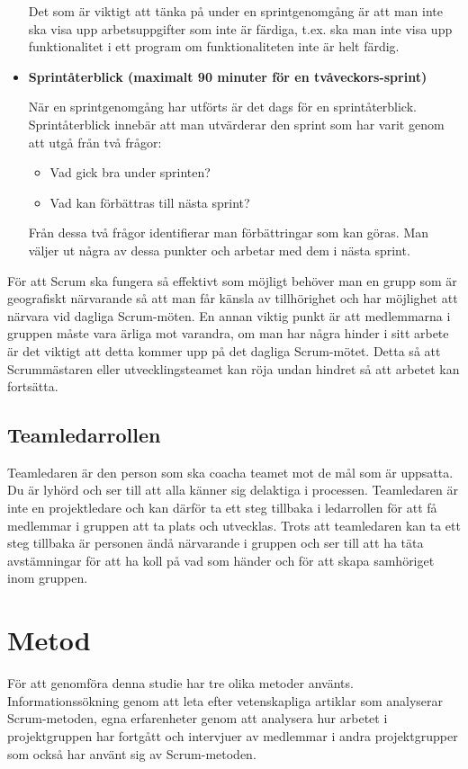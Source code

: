 \begin{itemize}
Det som är viktigt att tänka på under en sprintgenomgång är att man inte ska visa upp arbetsuppgifter som inte är färdiga, t.ex. ska man inte visa upp funktionalitet i ett program om funktionaliteten inte är helt färdig.

\item \textbf{Sprintåterblick (maximalt 90 minuter för en tvåveckors-sprint)}

När en sprintgenomgång har utförts är det dags för en sprintåterblick. Sprintåterblick innebär att man utvärderar den sprint som har varit genom att utgå från två frågor:

\begin{itemize}
	\item Vad gick bra under sprinten?
	\item Vad kan förbättras till nästa sprint?
\end{itemize}

Från dessa två frågor identifierar man förbättringar som kan göras. Man väljer ut några av dessa punkter och arbetar med dem i nästa sprint.

\end{itemize}

För att Scrum ska fungera så effektivt som möjligt behöver man en grupp som är geografiskt närvarande så att man får känsla av tillhörighet och har möjlighet att närvara vid dagliga Scrum-möten. En annan viktig punkt är att medlemmarna i gruppen måste vara ärliga mot varandra, om man har några hinder i sitt arbete är det viktigt att detta kommer upp på det dagliga Scrum-mötet. Detta så att Scrummästaren eller utvecklingsteamet kan röja undan hindret så att arbetet kan fortsätta.\cite{scrum}

\subsection{Teamledarrollen}
Teamledaren är den person som ska coacha teamet mot de mål som är uppsatta. Du är lyhörd och ser till att alla känner sig delaktiga i processen. Teamledaren är inte en projektledare och kan därför ta ett steg tillbaka i ledarrollen för att få medlemmar i gruppen att ta plats och utvecklas.\cite{teamledare} Trots att teamledaren kan ta ett steg tillbaka är personen ändå närvarande i gruppen och ser till att ha täta avstämningar för att ha koll på vad som händer och för att skapa samhöriget inom gruppen.\cite{teamguide}

\section{Metod}
För att genomföra denna studie har tre olika metoder använts. Informationssökning genom att leta efter vetenskapliga artiklar som analyserar Scrum-metoden, egna erfarenheter genom att analysera hur arbetet i projektgruppen har fortgått och intervjuer av medlemmar i andra projektgrupper som också har använt sig av Scrum-metoden.

